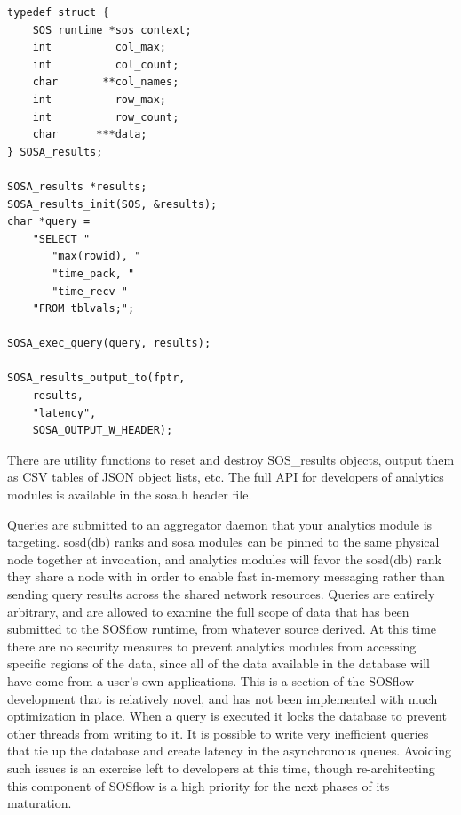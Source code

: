 \begin{lstlisting}[frame=single, basicstyle=\small]
typedef struct {
    SOS_runtime *sos_context;
    int          col_max;
    int          col_count;
    char       **col_names;
    int          row_max;
    int          row_count;
    char      ***data;
} SOSA_results;

SOSA_results *results;                                                                                                                       
SOSA_results_init(SOS, &results);
char *query =
    "SELECT "
       "max(rowid), "
       "time_pack, "
       "time_recv "
    "FROM tblvals;";

SOSA_exec_query(query, results);

SOSA_results_output_to(fptr,
    results,
    "latency",
    SOSA_OUTPUT_W_HEADER);
\end{lstlisting}

There are utility functions to reset and destroy SOS\_results objects,
output them as CSV tables of JSON object lists, etc.
%
The full API for developers of analytics modules is available in the
sosa.h header file.

Queries are submitted to an aggregator daemon that your analytics
module is targeting.
%
sosd(db) ranks and sosa modules can be pinned to the same physical
node together at invocation, and analytics modules will favor the
sosd(db) rank they share a node with in order to enable fast in-memory
messaging rather than sending query results across the shared network
resources.
%
Queries are entirely arbitrary, and are allowed to examine the full
scope of data that has been submitted to the SOSflow runtime, from
whatever source derived.
%
At this time there are no security measures to prevent analytics
modules from accessing specific regions of the data, since all of the
data available in the database will have come from a user's own
applications.
%
This is a section of the SOSflow development that is relatively novel,
and has not been implemented with much optimization in place.
%
When a query is executed it locks the database to prevent other
threads from writing to it.
%
It is possible to write very inefficient queries that tie up the
database and create latency in the asynchronous queues.
%
Avoiding such issues is an exercise left to developers at this time,
though re-architecting this component of SOSflow is a high priority
for the next phases of its maturation.





